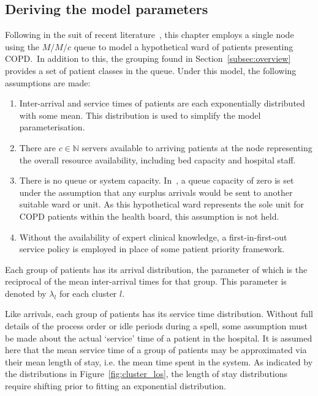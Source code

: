 \subsection{Deriving the model parameters}\label{subsec:derive}

Following in the suit of recent literature~\cite{Steins2013,Williams2015}, this
chapter employs a single node using the \(M/M/c\) queue to model a hypothetical
ward of patients presenting COPD.\ In addition to this, the grouping found in
Section~\ref{subsec:overview} provides a set of patient classes in the queue.
Under this model, the following assumptions are made:

\begin{enumerate}
    \item Inter-arrival and service times of patients are each exponentially
        distributed with some mean. This distribution is used to simplify the
        model parameterisation.
    \item There are \(c \in \mathbb{N}\) servers available to arriving patients
        at the node representing the overall resource availability, including
        bed capacity and hospital staff.
    \item There is no queue or system capacity. In~\cite{Williams2015}, a
        queue capacity of zero is set under the assumption that any surplus
        arrivals would be sent to another suitable ward or unit. As this
        hypothetical ward represents the sole unit for COPD patients within the
        health board, this assumption is not held.
    \item Without the availability of expert clinical knowledge, a
        first-in-first-out service policy is employed in place of some patient
        priority framework.
\end{enumerate}

Each group of patients has its arrival distribution, the parameter of which is
the reciprocal of the mean inter-arrival times for that group. This parameter
is denoted by \(\lambda_l\) for each cluster \(l\).

Like arrivals, each group of patients has its service time distribution.
Without full details of the process order or idle periods during a spell, some
assumption must be made about the actual `service' time of a patient in the
hospital. It is assumed here that the mean service time of a group of patients
may be approximated via their mean length of stay, i.e. the mean time spent in
the system. As indicated by the distributions in Figure~\ref{fig:cluster_los},
the length of stay distributions require shifting prior to fitting an
exponential distribution.

